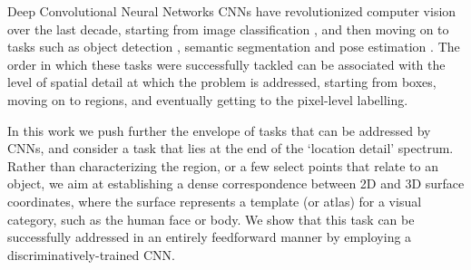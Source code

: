 Deep Convolutional Neural Networks CNNs \cite{lecun1998gradient}
have revolutionized computer vision over the last decade, starting from  image classification \cite{krizhevsky2012imagenet, simonyan2014very, szegedy2015going,he2016deep}, and then moving on to tasks such as object detection \cite{girshick2014rich}, semantic segmentation \cite{long2015fully,chen2016deeplab} and pose estimation \cite{chen2014articulated, tompson2014joint,yang2016end,newell2016stacked}.
The order in which these tasks were successfully tackled can  be associated with the level of spatial detail at which the problem is addressed, starting from boxes, moving on to regions, and eventually getting to the  pixel-level labelling.

In this work we push further the envelope of tasks that can be addressed by CNNs, and consider a task that lies at the end of the `location detail' spectrum.
    Rather than characterizing  the region, or a few select points  that relate to an object, we aim at establishing a dense correspondence between 2D  and 3D surface coordinates, where the surface represents a template (or atlas) for a visual category, such as the human face or body. 
We show that  this task can be successfully addressed in an entirely feedforward manner by employing a discriminatively-trained CNN. 


